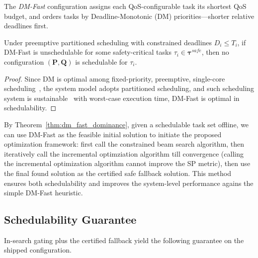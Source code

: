     \begin{definition}
    \label{def_dm_fast}
    The \emph{DM-Fast} configuration assigns each QoS-configurable task its shortest QoS budget,
    and orders tasks by Deadline-Monotonic (DM) priorities---shorter relative deadlines first.
    \end{definition}

    \begin{theorem}
    \label{thm:dm_fast_dominance}
    Under preemptive partitioned scheduling with constrained deadlines $D_i \le T_i$,
    if DM-Fast is unschedulable for some safety-critical tasks $\tau_i \in \boldsymbol{\tau}^{safe}$,
    then no configuration $(\boldsymbol{P},\boldsymbol{Q})$ is schedulable for $\tau_i$.
    \end{theorem}
    \begin{proof}
    Since DM is optimal among fixed-priority, preemptive, single-core scheduling~\cite{Leung1982DeadlineMonotonic},
    the system model adopts partitioned scheduling, and such scheduling system is sustainable~\cite{baruah2006sustainable} with worst-case execution time,
    DM-Fast is optimal in schedulability.
    \end{proof}

    By Theorem~\ref{thm:dm_fast_dominance}, given a schedulable task set offline, we can use DM-Fast as the feasible initial solution to initiate the
    proposed optimization framework: first call the constrained beam search algorithm, then iteratively call the incremental optimziation algorithm till convergence
    (\ie calling the incremental optimization algorithm cannot improve the SP metric), then use the final found solution as the certified safe fallback solution.
    This method ensures both schedulability and improves the system-level performance agains the simple DM-Fast heuristic.

    \subsection{Schedulability Guarantee}
    \label{section_schedulability_guarantee}
    In-search gating plus the certified fallback yield the following guarantee
    on the shipped configuration.

